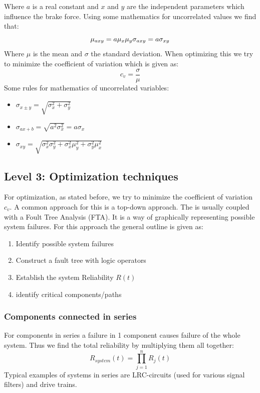 \documentclass[11pt, a4paper]{article}
\numberwithin{equation}{section}
\numberwithin{figure}{section}
\begin{document}
Where $a$ is a real constant and $x$ and $y$ are the independent parameters which influence the brake force. Using some mathematics for uncorrelated values we find that:
\begin{equation}
  \mu_{axy} = a\mu_x\mu_y\\
  \sigma_{axy} = a\sigma_{xy}
\end{equation}
Where $\mu$ is the mean and $\sigma$ the standard deviation. When optimizing this we try to minimize the coefficient of variation which is given as:
\begin{equation}
  c_v = \frac{\sigma}{\mu}
\end{equation}
Some rules for mathematics of uncorrelated variables:
\begin{itemize}
  \item[] $\sigma_{x\pm y} = \sqrt{\sigma_x^2 + \sigma_y^2}$
  \item[] $\sigma_{ax + b} = \sqrt{a^2\sigma_x^2} = a\sigma_x$
  \item[] $\sigma_{xy} = \sqrt{\sigma_x^2\sigma_y^2 + \sigma_x^2\mu_y^2 + \sigma_y^2\mu_x^2}$
\end{itemize}


\subsection{Level 3: Optimization techniques}
For optimization, as stated before, we try to minimize the coefficient of variation $c_v$. A common approach for this is a top-down approach. The is usually coupled with a Foult Tree Analysis (FTA). It is a way of graphically representing possible system failures. For this approach the general outline is given as:
\begin{enumerate}
  \item Identify possible system failures
  \item Construct a fault tree with logic operators
  \item Establish the system Reliability $R(t)$
  \item identify critical components/paths
\end{enumerate} 

\subsubsection{Components connected in series}
For components in series a failure in 1 component causes failure of the whole system. Thus we find the total reliability by multiplying them all together:
\begin{equation}
  R_{system}(t) = \prod_{j=1}^n R_j(t)
\end{equation}
Typical examples of systems in series are LRC-circuits (used for various signal filters) and drive trains.
\end{document}
